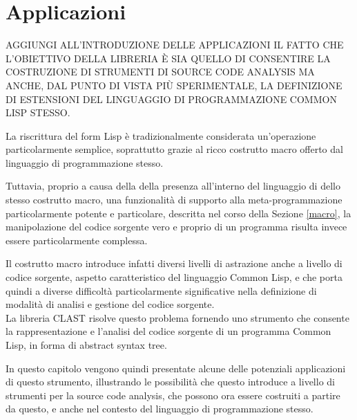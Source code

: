\documentclass{book}
\begin{document}




\endgroup

\chapter{Applicazioni}
\label{applications}

AGGIUNGI ALL’INTRODUZIONE DELLE APPLICAZIONI IL FATTO CHE L’OBIETTIVO DELLA
LIBRERIA È SIA QUELLO DI CONSENTIRE LA COSTRUZIONE DI STRUMENTI DI SOURCE CODE
ANALYSIS MA ANCHE, DAL PUNTO DI VISTA PIÙ SPERIMENTALE, LA DEFINIZIONE DI
ESTENSIONI DEL LINGUAGGIO DI PROGRAMMAZIONE COMMON LISP STESSO.

La riscrittura del form Lisp è tradizionalmente considerata un'operazione
particolarmente semplice, soprattutto grazie al ricco costrutto macro offerto
dal linguaggio di programmazione stesso.

Tuttavia, proprio a causa della della presenza all'interno del linguaggio di
dello stesso costrutto macro, una funzionalità di supporto alla
meta-programmazione particolarmente potente e particolare, descritta nel corso
della Sezione \ref{macro}, la manipolazione del codice sorgente vero e proprio
di un programma risulta invece essere particolarmente complessa.

Il costrutto macro introduce infatti diversi livelli di astrazione anche a
livello di codice sorgente, aspetto caratteristico del linguaggio Common Lisp, e
che porta quindi a diverse difficoltà particolarmente significative nella
definizione di modalità di analisi e gestione del codice sorgente.\\


La libreria CLAST risolve questo problema fornendo uno strumento che consente la
rappresentazione e l'analisi del codice sorgente di un programma Common Lisp, in
forma di abstract syntax tree.

In questo capitolo vengono quindi presentate alcune delle potenziali
applicazioni di questo strumento, illustrando le possibilità che questo
introduce a livello di strumenti per la source code analysis, che possono ora
essere costruiti a partire da questo, e anche nel contesto del linguaggio di
programmazione stesso.

\end{document}
